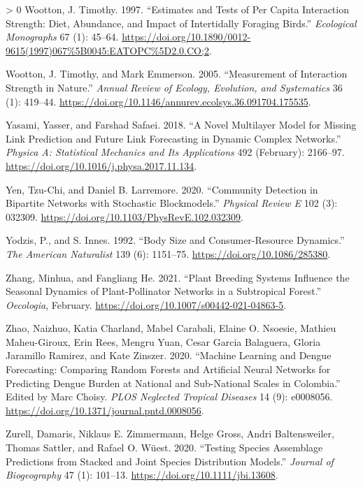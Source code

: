 \documentclass[11pt]{article}
\newlength{\cslhangindent}
\newenvironment{CSLReferences}[3] %
 {%
  \setlength{\parindent}{0pt}
  \ifodd #1 \everypar{\setlength{\hangindent}{\cslhangindent}}\ignorespaces\fi
  \ifnum #2 > 0
  \setlength{\parskip}{#2\baselineskip}
  \fi
 }%
 {}
\begin{document}
\begin{CSLReferences}{1}{0}
\leavevmode\hypertarget{ref-Wootton1997EstTes}{}%
Wootton, J. Timothy. 1997. {``Estimates and Tests of Per Capita
Interaction Strength: Diet, Abundance, and Impact of Intertidally
Foraging Birds.''} \emph{Ecological Monographs} 67 (1): 45--64.
\url{https://doi.org/10.1890/0012-9615(1997)067\%5B0045:EATOPC\%5D2.0.CO;2}.

\leavevmode\hypertarget{ref-Wootton2005MeaInt}{}%
Wootton, J. Timothy, and Mark Emmerson. 2005. {``Measurement of
Interaction Strength in Nature.''} \emph{Annual Review of Ecology,
Evolution, and Systematics} 36 (1): 419--44.
\url{https://doi.org/10.1146/annurev.ecolsys.36.091704.175535}.

\leavevmode\hypertarget{ref-Yasami2018NovMul}{}%
Yasami, Yasser, and Farshad Safaei. 2018. {``A Novel Multilayer Model
for Missing Link Prediction and Future Link Forecasting in Dynamic
Complex Networks.''} \emph{Physica A: Statistical Mechanics and Its
Applications} 492 (February): 2166--97.
\url{https://doi.org/10.1016/j.physa.2017.11.134}.

\leavevmode\hypertarget{ref-Yen2020ComDet}{}%
Yen, Tzu-Chi, and Daniel B. Larremore. 2020. {``Community Detection in
Bipartite Networks with Stochastic Blockmodels.''} \emph{Physical Review
E} 102 (3): 032309. \url{https://doi.org/10.1103/PhysRevE.102.032309}.

\leavevmode\hypertarget{ref-Yodzis1992BodSiz}{}%
Yodzis, P., and S. Innes. 1992. {``Body Size and Consumer-Resource
Dynamics.''} \emph{The American Naturalist} 139 (6): 1151--75.
\url{https://doi.org/10.1086/285380}.

\leavevmode\hypertarget{ref-Zhang2021PlaBre}{}%
Zhang, Minhua, and Fangliang He. 2021. {``Plant Breeding Systems
Influence the Seasonal Dynamics of Plant-Pollinator Networks in a
Subtropical Forest.''} \emph{Oecologia}, February.
\url{https://doi.org/10.1007/s00442-021-04863-5}.

\leavevmode\hypertarget{ref-Zhao2020MacLea}{}%
Zhao, Naizhuo, Katia Charland, Mabel Carabali, Elaine O. Nsoesie,
Mathieu Maheu-Giroux, Erin Rees, Mengru Yuan, Cesar Garcia Balaguera,
Gloria Jaramillo Ramirez, and Kate Zinszer. 2020. {``Machine Learning
and Dengue Forecasting: Comparing Random Forests and Artificial Neural
Networks for Predicting Dengue Burden at National and Sub-National
Scales in Colombia.''} Edited by Marc Choisy. \emph{PLOS Neglected
Tropical Diseases} 14 (9): e0008056.
\url{https://doi.org/10.1371/journal.pntd.0008056}.

\leavevmode\hypertarget{ref-Zurell2020TesSpe}{}%
Zurell, Damaris, Niklaus E. Zimmermann, Helge Gross, Andri
Baltensweiler, Thomas Sattler, and Rafael O. Wüest. 2020. {``Testing
Species Assemblage Predictions from Stacked and Joint Species
Distribution Models.''} \emph{Journal of Biogeography} 47 (1): 101--13.
\url{https://doi.org/10.1111/jbi.13608}.

\end{CSLReferences}
\end{document}
